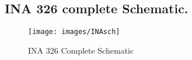 \begin{annexesenv}

\partannexes

\chapter{INA 326 complete Schematic.}

\begin{figure}[!htpb]
\centering
\caption{INA 326 Complete Schematic}
\label{INA_Complete}
\texttt{[image: images/INAsch]}
\end{figure}

\end{annexesenv}

